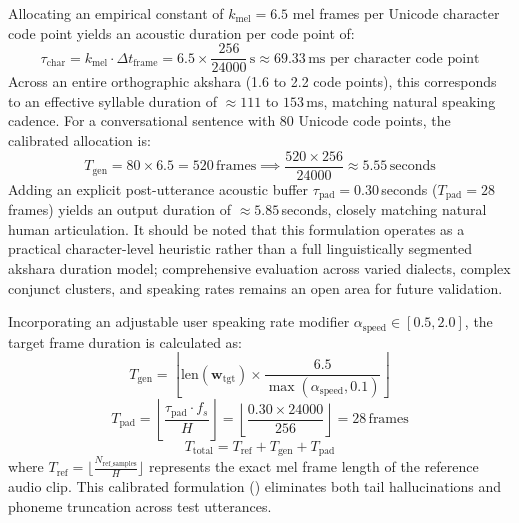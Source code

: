 Allocating an empirical constant of $k_{\text{mel}} = 6.5$ mel frames per Unicode character code point yields an acoustic duration per code point of:
\begin{equation}
    \tau_{\text{char}} = k_{\text{mel}} \cdot \Delta t_{\text{frame}} = 6.5 \times \frac{256}{24000}\,\text{s} \approx 69.33\,\text{ms per character code point}
    \label{eq:char_temporal_density}
\end{equation}
Across an entire orthographic akshara (1.6 to 2.2 code points), this corresponds to an effective syllable duration of $\approx 111$ to $153$\,ms, matching natural speaking cadence. For a conversational sentence with 80 Unicode code points, the calibrated allocation is:
\begin{equation}
    T_{\text{gen}} = 80 \times 6.5 = 520\,\text{frames} \implies \frac{520 \times 256}{24000} \approx 5.55\,\text{seconds}
\end{equation}
Adding an explicit post-utterance acoustic buffer $\tau_{\text{pad}} = 0.30$\,seconds ($T_{\text{pad}} = 28$ frames) yields an output duration of $\approx 5.85$\,seconds, closely matching natural human articulation. It should be noted that this formulation operates as a practical character-level heuristic rather than a full linguistically segmented akshara duration model; comprehensive evaluation across varied dialects, complex conjunct clusters, and speaking rates remains an open area for future validation.

Incorporating an adjustable user speaking rate modifier $\alpha_{\text{speed}} \in [0.5, 2.0]$, the target frame duration is calculated as:
\begin{equation}
    T_{\text{gen}} = \left\lfloor \text{len}(\mathbf{w}_{\text{tgt}}) \times \frac{6.5}{\max(\alpha_{\text{speed}}, 0.1)} \right\rfloor
    \label{eq:calibrated_gen_frames}
\end{equation}
\begin{equation}
    T_{\text{pad}} = \left\lfloor \frac{\tau_{\text{pad}} \cdot f_s}{H} \right\rfloor = \left\lfloor \frac{0.30 \times 24000}{256} \right\rfloor = 28\,\text{frames}
    \label{eq:pad_frames}
\end{equation}
\begin{equation}
    T_{\text{total}} = T_{\text{ref}} + T_{\text{gen}} + T_{\text{pad}}
    \label{eq:total_frames}
\end{equation}
where $T_{\text{ref}} = \lfloor \frac{N_{\text{ref\_samples}}}{H} \rfloor$ represents the exact mel frame length of the reference audio clip. This calibrated formulation () eliminates both tail hallucinations and phoneme truncation across test utterances.

